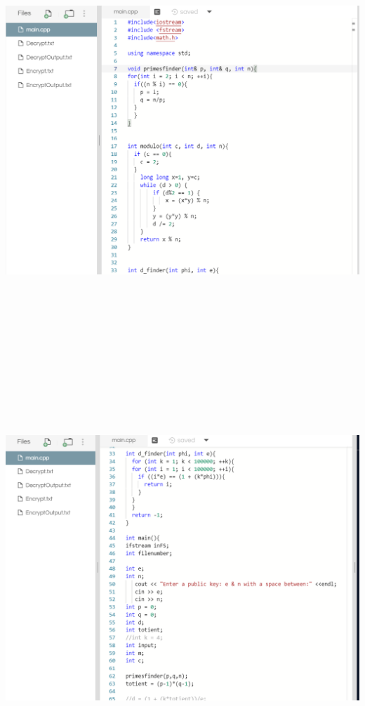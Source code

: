 \documentclass{article}
\begin{document}
\begin{solution}
\includegraphics[width=16cm, height=16cm]{1a.png}\\
\includegraphics[width=16cm, height=16cm]{2a.png}\\

\end{solution}
\end{document}
